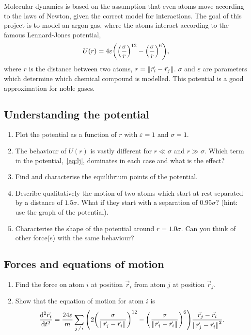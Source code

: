 \documentclass[11pt,british,a4paper]{report}
\begin{document}
Molecular dynamics is based on the assumption that even atoms move according to the laws of Newton, given the correct model for interactions. The goal of this project is to model an argon gas, where the atoms interact according to the famous Lennard-Jones potential,
\begin{equation}
    U(r) = 4\varepsilon\qty(\qty(\frac{\sigma}{r})^{12} - \qty(\frac{\sigma}{r})^6), \label{eq:lj}
\end{equation}
where \(r\) is the distance between two atoms, \(r=\norm{\vec{r}_i-\vec{r}_j}\). \(\sigma\) and \(\varepsilon\) are parameters which determine which chemical compound is modelled. This potential is a good approximation for noble gases.

\subsection{Understanding the potential}\label{subsec:understanding}
\begin{enumerate}[label=\roman*.]
    \item Plot the potential as a function of \(r\) with \(\varepsilon=1\) and \(\sigma=1\).
    \item The behaviour of \(U(r)\) is vastly different for \(r \ll \sigma\) and \(r \gg \sigma\). Which term in the potential,~\vref{eq:lj}, dominates in each case and what is the effect?
    \item Find and characterise the equilibrium points of the potential.
    \item Describe qualitatively the motion of two atoms which start at rest separated by a distance of \(\num{1.5}\sigma\). What if they start with a separation of \(\num{0.95}\sigma\)?  (hint: use the graph of the potential).
    \item Characterise the shape of the potential around \(r=\num{1.0}\sigma\). Can you think of other force(s) with the same behaviour?
\end{enumerate}

\subsection{Forces and equations of motion}
\begin{enumerate}[label=\roman*.]
    \item Find the force on atom \(i\) at position \(\vec{r}_i\) from atom \(j\) at position \(\vec{r}_j\).
    \item Show that the equation of motion for atom \(i\) is
    \begin{equation}
        \dv[2]{\vec{r}_i}{t} = \frac{24\varepsilon}{m} \sum_{j \neq i} \qty(2\qty(\frac{\sigma}{\norm{\vec{r}_j-\vec{r}_i}})^{12}-\qty(\frac{\sigma}{\norm{\vec{r}_j-\vec{r}_i}})^6)\frac{\vec{r}_j-\vec{r}_i}{\norm{\vec{r}_j-\vec{r}_i}^2}.
    \end{equation}
\end{enumerate}
\end{document}
